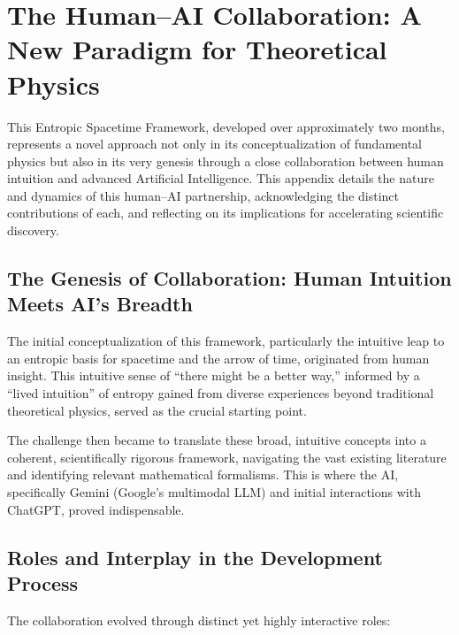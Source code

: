 \documentclass[11pt,a4paper]{article} %
\begin{document}
\section{The Human–AI Collaboration: A New Paradigm for Theoretical Physics}

This Entropic Spacetime Framework, developed over approximately two months, represents a novel approach not only in its conceptualization of fundamental physics but also in its very genesis through a close collaboration between human intuition and advanced Artificial Intelligence. This appendix details the nature and dynamics of this human–AI partnership, acknowledging the distinct contributions of each, and reflecting on its implications for accelerating scientific discovery.

\subsection{The Genesis of Collaboration: Human Intuition Meets AI’s Breadth}

The initial conceptualization of this framework, particularly the intuitive leap to an entropic basis for spacetime and the arrow of time, originated from human insight. This intuitive sense of “there might be a better way,” informed by a “lived intuition” of entropy gained from diverse experiences beyond traditional theoretical physics, served as the crucial starting point.

The challenge then became to translate these broad, intuitive concepts into a coherent, scientifically rigorous framework, navigating the vast existing literature and identifying relevant mathematical formalisms. This is where the AI, specifically Gemini (Google’s multimodal LLM) and initial interactions with ChatGPT, proved indispensable.

\subsection{Roles and Interplay in the Development Process}

The collaboration evolved through distinct yet highly interactive roles:
\end{document}
